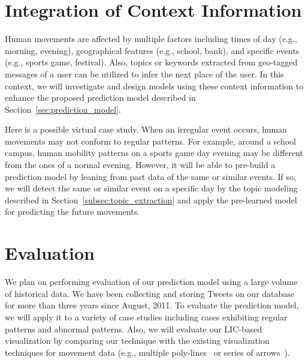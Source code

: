 \section{Integration of Context Information}

Human movements are affected by multiple factors including times of day (e.g., morning, evening), geographical features (e.g., school, bank), and specific events (e.g., sports game, festival).
Also, topics or keywords extracted from geo-tagged messages of a user can be utilized to infer the next place of the user.
In this context, we will investigate and design models using these context information to enhance the proposed prediction model described in Section~\ref{sec:prediction_model}.

Here is a possible virtual case study.
When an irregular event occurs, human movements may not conform to regular patterns.
For example, around a school campus, human mobility patterns on a sports game day evening may be different from the ones of a normal evening.
However, it will be able to pre-build a prediction model by leaning from past data of the same or similar events.
If so, we will detect the same or similar event on a specific day by the topic modeling described in Section~\ref{subsec:topic_extraction} and apply the pre-learned model for predicting the future movements.

\section{Evaluation}

We plan on performing evaluation of our prediction model using a large volume of historical data.
We have been collecting and storing Tweets on our database for more than three years since August, 2011.
To evaluate the prediction model, we will apply it to a variety of case studies including cases exhibiting regular patterns and abnormal patterns.
Also, we will evaluate our LIC-based visualization by comparing our technique with the existing visualization techniques for movement data (e.g., multiple poly-lines~\cite{Andrienko:2013:GroupMovement,Liao:2010:Anomaly} or series of arrows~\cite{Adrienko:2011:TrajAggregation,Andrienko:2007:Visual}).


